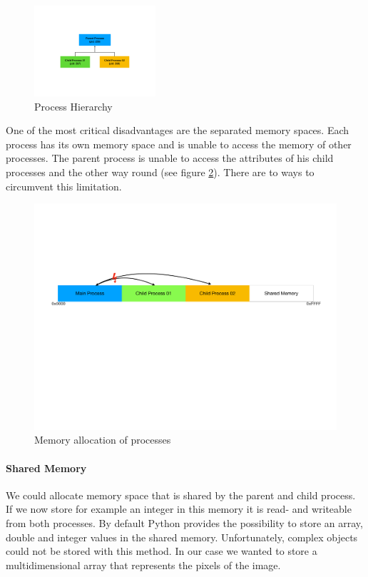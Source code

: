\documentclass[10pt]{scrartcl}
\begin{document}
\begin{figure}[h]
  \centering
  \includegraphics[width=0.4\textwidth]{images/processhierarchy.pdf}
  \caption{Process Hierarchy} 
  \label{fig:processhierarchy} 
\end{figure}

One of the most critical disadvantages are the separated memory spaces. Each process has its own memory space and is unable to access the memory of other processes. The parent process is unable to access the attributes of his child processes and the other way round (see figure \ref{fig:memory}). There are to ways to circumvent this limitation. 

\begin{figure}[h]
  \centering
  \includegraphics[width=\textwidth]{images/memory.pdf}
  \caption{Memory allocation of processes} 
  \label{fig:memory} 
\end{figure}

\paragraph{Shared Memory}

We could allocate memory space that is shared by the parent and child process. If we now store for example an integer in this memory it is read- and writeable from both processes. By default Python provides the possibility to store an array, double and integer values in the shared memory. Unfortunately, complex objects could not be stored with this method. In our case we wanted to store a multidimensional array that represents the pixels of the image.
\end{document}
